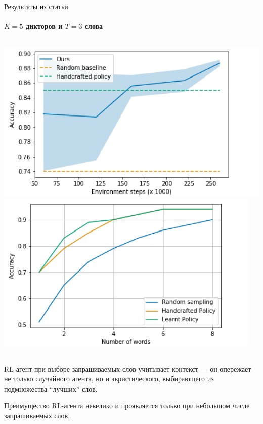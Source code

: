 \documentclass[aspectratio=43]{beamer}
\begin{document}
\begin{frame}{Результаты из статьи}
    \framesubtitle{$K = 5$ дикторов и $T = 3$ слова}
    \begin{columns}
        \centering
        \includegraphics[scale=0.5]{isr_training.png}
        \includegraphics[scale=0.5]{isr_word_sweep.png}
    \end{columns}\vspace*{1em}

    RL-агент при выборе запрашиваемых слов учитывает контекст --- он опережает
    не только случайного агента, но и эвристического, выбирающего из
    подмножества ``лучших'' слов.\vspace*{1em}

    Преимущество RL-агента невелико и проявляется только при небольшом числе
    запрашиваемых слов.
\end{frame}
\end{document}

